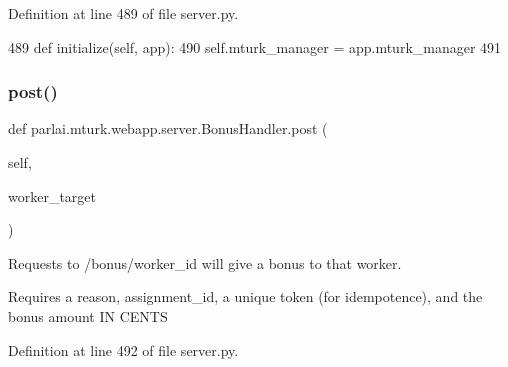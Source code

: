Definition at line 489 of file server.\+py.


\begin{DoxyCode}
489     \textcolor{keyword}{def }initialize(self, app):
490         self.mturk\_manager = app.mturk\_manager
491 
\end{DoxyCode}
\mbox{\label{classparlai_1_1mturk_1_1webapp_1_1server_1_1BonusHandler_acdeaf6529109287285903ed8babe864c}} 
\subsubsection{\texorpdfstring{post()}{post()}}
{\footnotesize\ttfamily def parlai.\+mturk.\+webapp.\+server.\+Bonus\+Handler.\+post (\begin{DoxyParamCaption}\item[{}]{self,  }\item[{}]{worker\+\_\+target }\end{DoxyParamCaption})}

\begin{DoxyVerb}Requests to /bonus/{worker_id} will give a bonus to that worker.

Requires a reason, assignment_id, a unique token (for idempotence), and the
bonus amount IN CENTS
\end{DoxyVerb}
 

Definition at line 492 of file server.\+py.


